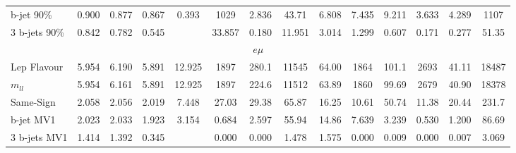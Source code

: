 \begin{table}
\begin{center}
{\begin{tabular}{l||cccc||cc|ccc|ccc||c }
            b-jet 90\%    &        0.900 &        0.877 &        0.867 &      0.393 &     1029     &        2.836 &       43.71  &        6.808 &        7.435 &        9.211 &        3.633 &        4.289 &     1107        \\        
            3 b-jets 90\% &        0.842 &        0.782 &        0.545 &            &       33.857 &        0.180 &       11.951 &        3.014 &        1.299 &        0.607 &        0.171 &        0.277 &       51.35     \\\hline\hline      
            \multicolumn{14}{c}{$e\mu$} \\ \hline                                                                                                                                                                                                                       
            Lep Flavour   &        5.954 &        6.190 &        5.891 &     12.925 &     1897     &      280.1   &    11545     &       64.00  &     1864     &      101.1   &     2693     &       41.11  &    18487        \\
            $m_{ll}$      &        5.954 &        6.161 &        5.891 &     12.925 &     1897     &      224.6   &    11512     &       63.89  &     1860     &       99.69  &     2679     &       40.90  &    18378        \\        
            Same-Sign     &        2.058 &        2.056 &        2.019 &      7.448 &       27.03  &       29.38  &       65.87  &       16.25  &       10.61  &       50.74  &       11.38  &       20.44  &      231.7      \\\hline  
                                                                                                                                                                                                                                     
            b-jet MV1     &        2.023 &        2.033 &        1.923 &      3.154 &        0.684 &        2.597 &       55.94  &       14.86  &        7.639 &        3.239 &        0.530 &        1.200 &       86.69     \\        
            3 b-jets MV1  &        1.414 &        1.392 &        0.345 &            &        0.000 &        0.000 &        1.478 &        1.575 &        0.000 &        0.009 &        0.000 &        0.007 &        3.069    \\\hline  
                                                                                                                                                                                                                                     

\end{tabular}}
\end{center}
\end{table}
